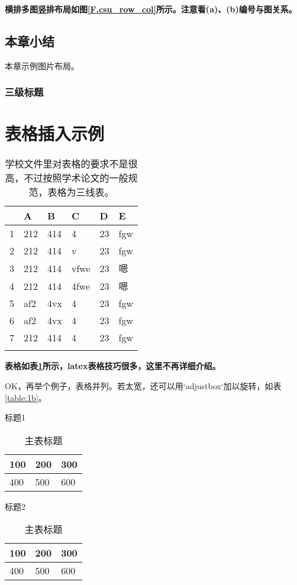 \textbf{横排多图竖排布局如图\ref{F.csu_row_col}所示。注意看(a)、(b)编号与图关系。}

\subsection{本章小结}
本章示例图片布局。
\subsubsection{三级标题}

\newpage


\section{表格插入示例}

\begin{table}[htb]
  \centering
  \caption{学校文件里对表格的要求不是很高，不过按照学术论文的一般规范，表格为三线表。}
  \label{T.example}
  \begin{tabular}{llllll}
  \hline
   & A  & B  & C  & D  & E \\
  \hline
1 	& 212 & 414 & 4 		& 23 & fgw	\\
2 	& 212 & 414 & v 		& 23 & fgw	\\
3 	& 212 & 414 & vfwe		& 23 & 嗯	\\
4 	& 212 & 414 & 4fwe		& 23 & 嗯	\\
5 	& af2 & 4vx & 4 		& 23 & fgw	\\
6 	& af2 & 4vx & 4 		& 23 & fgw	\\
7 	& 212 & 414 & 4 		& 23 & fgw	\\

\hline{}
\end{tabular}
\end{table}

\textbf{表格如表\ref{T.example}所示，latex表格技巧很多，这里不再详细介绍。}

OK，再举个例子，表格并列。若太宽，还可以用`adjustbox`加以旋转，如表\ref{table:1b}。

\begin{table}[htp]
	\centering
	\begin{subtable}[t]{2in}
		\centering
		\caption{标题1}\label{table:1a}
		\begin{tabular}{|l|l|l|}
		\hline
		100 & 200 & 300\\
		\hline
		400 & 500 & 600\\
		\hline
		\end{tabular}
	\end{subtable}
	\quad
	\begin{subtable}[t]{2in}
		\centering
		\caption{标题2}\label{table:1b}
		\begin{adjustbox}{angle=90}
		\begin{tabular}{|l|l|l|}
		\hline
		100 & 200 & 300\\
		\hline
		400 & 500 & 600\\
		\hline
		\end{tabular}
		\end{adjustbox}
	\end{subtable}
	\caption{主表标题}\label{table:1}
\end{table}

